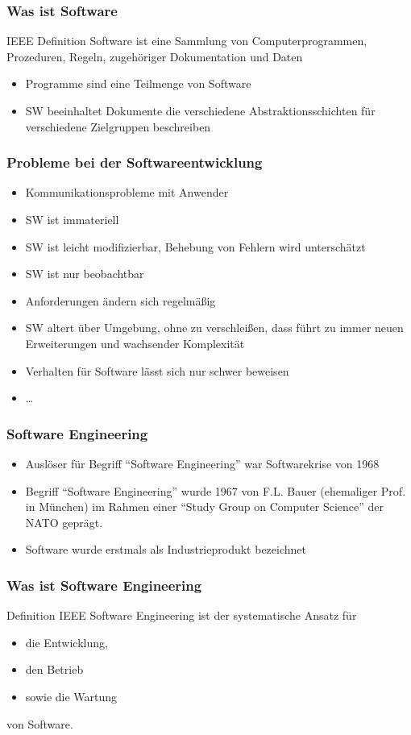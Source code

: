 \begin{frame}
\frametitle{Was ist Software}
	\begin{block}{IEEE Definition}
		Software ist eine Sammlung von Computerprogrammen, Prozeduren, Regeln,
		zugehöriger Dokumentation und Daten
		\begin{itemize}
			 \item Programme sind eine Teilmenge von Software
			 \item SW beeinhaltet Dokumente die verschiedene Abstraktionsschichten
			 für verschiedene Zielgruppen beschreiben
		\end{itemize}
	\end{block}
\end{frame}

\begin{frame}
\frametitle{Probleme bei der Softwareentwicklung}
	\begin{itemize}
		 \item Kommunikationsprobleme mit Anwender
		 \item SW ist immateriell
		 \item SW ist leicht modifizierbar, Behebung von Fehlern wird unterschätzt
		 \item SW ist nur beobachtbar
		 \item Anforderungen ändern sich regelmäßig
		 \item SW altert über Umgebung, ohne zu verschleißen,
		 dass führt zu immer neuen Erweiterungen und wachsender Komplexität
		 \item Verhalten für Software lässt sich nur schwer beweisen
		 \item \ldots
	\end{itemize}
\end{frame}

\begin{frame}
\frametitle{Software Engineering}
	\begin{itemize}
		\item Auslöser für Begriff ``Software Engineering'' war Softwarekrise von 1968
		\item Begriff ``Software Engineering'' wurde 1967 von F.L. Bauer (ehemaliger Prof. in München) 
		im Rahmen einer ``Study Group on Computer Science'' der NATO geprägt.
		\item Software wurde erstmals als Industrieprodukt bezeichnet
	\end{itemize}
\end{frame}

\begin{frame}
\frametitle{Was ist Software Engineering}
	\begin{block}{Definition IEEE}
		Software Engineering ist der systematische Ansatz für
		\begin{itemize}
			\item die Entwicklung,
			\item den Betrieb
			\item sowie die Wartung
		\end{itemize}
		von Software.
	\end{block}
\end{frame}

